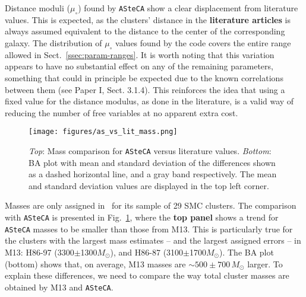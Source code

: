 \documentclass[referee]{aa}
\begin{document}
Distance moduli ($\mu_{\circ}$) found by \texttt{ASteCA} show a clear
displacement from literature values. This is expected, as the clusters' distance
in the \textbf{literature articles} is always assumed equivalent to the
distance to the center of the corresponding galaxy.
The distribution of $\mu_{\circ}$ values found by the code covers the entire
range allowed in Sect.~\ref{ssec:param-ranges}.
%
It is worth noting that this variation appears to have no substantial effect on
any of the remaining parameters, something that could in principle be expected
due to the known correlations between them (see Paper I, Sect. 3.1.4).
This reinforces the idea that using a fixed value for the distance modulus, as
done in the literature, is a valid way of reducing the number of free variables
at no apparent extra cost.\\

\begin{figure}
\centering
\texttt{[image: figures/as\_vs\_lit\_mass.png]}
\caption{\emph{Top}: Mass comparison for \texttt{ASteCA} versus literature
values.
\emph{Bottom}: BA plot with mean and standard deviation of the differences
shown as a dashed horizontal line, and a gray band respectively. The mean and
standard deviation values are displayed in the top left corner.}
\label{fig:as_vs_lit_mass}
\end{figure}

Masses are only assigned in~\citet[][M13]{Maia_2013} for its sample of 29
SMC clusters. The comparison with \texttt{ASteCA} is presented in
Fig.~\ref{fig:as_vs_lit_mass}, where the \textbf{top panel} shows a trend for
\texttt{ASteCA} masses to be smaller than those from M13. This is particularly
true for the clusters with the largest mass estimates -- and the largest
assigned errors -- in M13: H86-97 (3300$\pm$1300$M_{\odot}$), and H86-87
(3100$\pm$1700$M_{\odot}$). The BA plot (bottom) shows that, on average, M13
masses are ${\sim}500{\pm}700\,M_{\odot}$ larger.
%
To explain these differences, we need to compare the way total cluster masses
are obtained by M13 and \texttt{ASteCA}.
\end{document}
